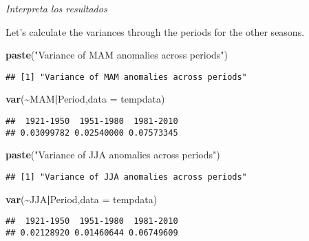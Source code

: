 \documentclass[
]{article}
\newenvironment{Shaded}{\begin{snugshade}}{\end{snugshade}}
\newcommand{\AttributeTok}[1]{\textcolor[rgb]{0.13,0.29,0.53}{#1}}
\newcommand{\FunctionTok}[1]{\textcolor[rgb]{0.13,0.29,0.53}{\textbf{#1}}}
\newcommand{\NormalTok}[1]{#1}
\newcommand{\SpecialCharTok}[1]{\textcolor[rgb]{0.81,0.36,0.00}{\textbf{#1}}}
\newcommand{\StringTok}[1]{\textcolor[rgb]{0.31,0.60,0.02}{#1}}
\begin{document}
\emph{Interpreta los resultados}

Let's calculate the variances through the periods for the other seasons.

\begin{Shaded}
\begin{Highlighting}[]
\FunctionTok{paste}\NormalTok{(}\StringTok{"Variance of MAM anomalies across periods"}\NormalTok{)}
\end{Highlighting}
\end{Shaded}

\begin{verbatim}
## [1] "Variance of MAM anomalies across periods"
\end{verbatim}

\begin{Shaded}
\begin{Highlighting}[]
\FunctionTok{var}\NormalTok{(}\SpecialCharTok{\textasciitilde{}}\NormalTok{MAM}\SpecialCharTok{|}\NormalTok{Period,}\AttributeTok{data =}\NormalTok{ tempdata)}
\end{Highlighting}
\end{Shaded}

\begin{verbatim}
##  1921-1950  1951-1980  1981-2010 
## 0.03099782 0.02540000 0.07573345
\end{verbatim}

\begin{Shaded}
\begin{Highlighting}[]
\FunctionTok{paste}\NormalTok{(}\StringTok{"Variance of JJA anomalies across periods"}\NormalTok{)}
\end{Highlighting}
\end{Shaded}

\begin{verbatim}
## [1] "Variance of JJA anomalies across periods"
\end{verbatim}

\begin{Shaded}
\begin{Highlighting}[]
\FunctionTok{var}\NormalTok{(}\SpecialCharTok{\textasciitilde{}}\NormalTok{JJA}\SpecialCharTok{|}\NormalTok{Period,}\AttributeTok{data =}\NormalTok{ tempdata)}
\end{Highlighting}
\end{Shaded}

\begin{verbatim}
##  1921-1950  1951-1980  1981-2010 
## 0.02128920 0.01460644 0.06749609
\end{verbatim}
\end{document}
